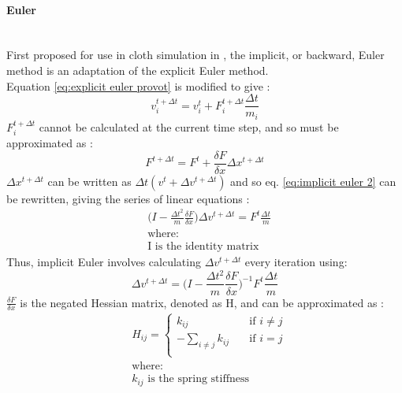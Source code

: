 \paragraph{Euler}\leavevmode\\
First proposed for use in cloth simulation in \textcite{Baraff1998}, the implicit, or backward, Euler method is an adaptation of the explicit Euler method.
\\Equation \ref{eq:explicit euler provot} is modified to give \parencite[3]{Kang2000}:
\begin{equation}
\label{eq:implicit euler 1}
  v^{t + \Delta t}_{i} = v^{t}_{i} + F^{t + \Delta t}_{i}\frac{\Delta t}{m_{i}}
\end{equation}
$F^{t + \Delta t}_{i}$ cannot be calculated at the current time step, and so must be approximated as \parencite[3]{Kang2000}:
\begin{equation}
\label{eq:implicit euler 2}
  F^{t + \Delta t} = F^{t} + \frac{\delta F}{\delta x}\Delta x^{t + \Delta t}
\end{equation}
$\Delta x^{t + \Delta t}$ can be written as $\Delta t(v^{t} + \Delta v^{t + \Delta t})$ and so eq. \ref{eq:implicit euler 2} can be rewritten, giving the series of linear equations \parencite[3]{Kang2000}:
\begin{equation}
\begin{split}
\label{eq:implicit euler 3}
  &\bigg(I - \frac{\Delta t^{2}}{m}\frac{\delta F}{\delta x}\bigg)\Delta v^{t + \Delta t} = F^{t}\frac{\Delta t}{m}
  \\&\text{where:}
  \\&\text{I is the identity matrix}
\end{split}
\end{equation}
Thus, implicit Euler involves calculating $\Delta v^{t + \Delta t}$ every iteration using:
\begin{equation}
\label{eq:implicit euler 4}
  \Delta v^{t + \Delta t} = \bigg(I - \frac{\Delta t^{2}}{m}\frac{\delta F}{\delta x}\bigg)^{-1}F^{t}\frac{\Delta t}{m}
\end{equation}
$\frac{\delta F}{\delta x}$ is the negated Hessian matrix, denoted as H, and can be approximated as \parencite[3]{Kang2000}:
\begin{equation}
\begin{split}
\label{eq:implicit euler 5}
&H_{ij} =
  \begin{cases}
    k_{ij}       & \quad \text{if } i \neq j\\
    -\sum_{i \neq j}{k_{ij}}  & \quad \text{if } i = j\\
  \end{cases}
\\&\text{where:}
\\&\text{$k_{ij}$ is the spring stiffness}
\end{split}
\end{equation}

